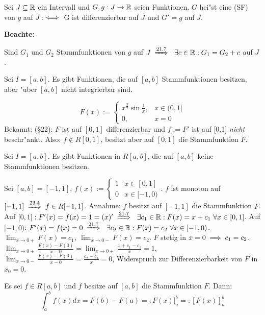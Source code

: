 \documentclass[a4paper,twoside,DIV15,BCOR12mm]{scrbook}
\begin{document}
\begin{definition}
Sei $J\subseteq\mathbb{R}$ ein Intervall und $G,g: J\to\mathbb{R}$ seien Funktionen. $G$ hei"st eine  (SF) von $g$ auf $J$ :$\iff$ G ist differenzierbar auf $J$ und $G'=g$ auf $J$.\\
\end{definition}
\textbf{Beachte:}
\begin{liste}
\item Sind $G_1$ und $G_2$ Stammfunktionen von $g$ auf $J \folgtnach{21.7}\ \exists c \in\MdR: G_1=G_2+c$ auf $J$.
\item Sei $I=[a,b]$. Es gibt Funktionen, die auf $[a,b]$ Stammfunktionen besitzen, aber "uber $[a,b]$ nicht integrierbar sind.
\begin{beispiel}
$$F(x) := \begin{cases}
x^{\frac{3}{2}} \sin\frac{1}{x},&x\in(0,1]\\
0,& x=0\end{cases}$$
Bekannt: (§22): $F$ ist auf $[0,1]$ differenzierbar und $f:=F'$ ist auf [0,1] \emph{nicht} beschr"ankt. Also: $f \notin R[0,1]$, besitzt aber auf $[0,1]$ die Stammfunktion $F$.
\end{beispiel}
\item Sei $I=[a,b]$. Es gibt Funktionen in $R[a,b]$, die auf $[a,b]$ keine Stammfunktionen besitzen.
\begin{beispiel}
Sei $[a,b]=[-1,1]$, $f(x):=\begin{cases}
1&x\in[0,1]\\
0&x\in[-1,0)\end{cases}$. $f$ ist monoton auf $[-1,1]\folgtnach{23.4}f\in R[-1,1]$. Annahme: $f$ besitzt auf $[-1, 1]$ die Stammfunktion $F$. Auf $[0,1]:F'(x)=f(x)=1=(x)'\folgtnach{21.7}\ \exists c_1 \in \MdR: F(x)=x+c_1\ \forall x \in [0,1]$. Auf $[-1, 0)$: $F'(x)=f(x)=0 \folgtnach{21.7}\ \exists c_2 \in \MdR: F(x)=c_2\ \forall x\in [-1,0)$. $\displaystyle\lim_{x\to 0+}F(x)=c_1,\ \displaystyle\lim_{x\to 0-}F(x)=c_2$. $F$ stetig in $x=0\implies c_1=c_2$.$\displaystyle\lim_{x \to 0+}\frac{F(x)-F(0)}{x-0}=\displaystyle\lim_{x\to 0+}\frac{x+c_1-c_1}{x}=1$, $\displaystyle\lim_{x\to 0-}\frac{F(x)-F(0)}{x-0}=\frac{c_2-c_1}{x}=0$, Widerspruch zur Differenzierbarkeit von $F$ in $x_0=0$.
\end{beispiel}
\end{liste}

\begin{satz}
Es sei $f\in R[a,b]$ und $f$ besitze auf $[a,b]$ die Stammfunktion $F$. Dann: 
$$\int_a^bf(x)dx = F(b) - F(a) =: F(x)|_a^b =: [F(x)]_a^b$$
\end{satz}
\end{document}
